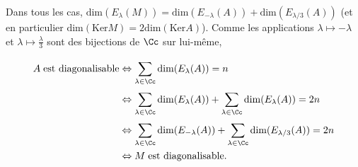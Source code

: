 {{Dans tous les cas, $\text{dim}(E_\lambda(M))=\text{dim}(E_{-\lambda}(A))+\text{dim}(E_{\lambda/3}(A))$ (et en particulier $\text{dim}(\text{Ker}M)=2\text{dim}(\text{Ker}A)$).
Comme les applications $\lambda\mapsto -\lambda$ et $\lambda\mapsto\frac{\lambda}{3}$ sont des bijections de $\Cc$ sur lui-même,

\begin{align*}\ensuremath
A\;\text{est diagonalisable}&\Leftrightarrow\sum_{\lambda\in\Cc}^{}\text{dim}(E_{\lambda}(A)) = n\\
 &\Leftrightarrow\sum_{\lambda\in\Cc}^{}\text{dim}(E_{\lambda}(A))+\sum_{\lambda\in\Cc}^{}\text{dim}(E_{\lambda}(A))= 2n\\
 &\Leftrightarrow\sum_{\lambda\in\Cc}^{}\text{dim}(E_{-\lambda}(A))+\sum_{\lambda\in\Cc}^{}\text{dim}(E_{\lambda/3}(A))= 2n\\
 &\Leftrightarrow M\;\text{est diagonalisable}.
\end{align*}}
}
